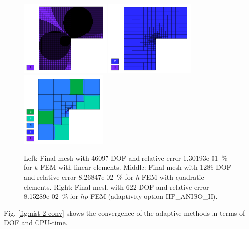 \documentclass[12pt]{elsarticle}
\begin{document}
\begin{figure}[H]
\centering
\vspace{-5mm}
\includegraphics[height=3.7cm]{nist/nist-2/mesh_h1_aniso.png}
\includegraphics[height=3.7cm]{nist/nist-2/mesh_h2_aniso.png}
\includegraphics[height=3.7cm]{nist/nist-2/mesh_hp_aniso.png}
\vspace{-3mm}
\caption{
Left: Final mesh with 46097 DOF and relative error 1.30193e-01~\% for $h$-FEM with linear elements.
Middle: Final mesh with 1289 DOF and relative error 8.26847e-02~\% for $h$-FEM with quadratic elements. 
Right: Final mesh with 622 DOF and relative error 8.15289e-02~\% for $hp$-FEM (adaptivity option HP\_ANISO\_H).}
\label{fig:nist-2-hp-aniso}
\vspace{-3mm}
\end{figure}

Fig. \ref{fig:nist-2-conv} shows the convergence of the adaptive methods in terms of DOF and CPU-time.

\end{document}
